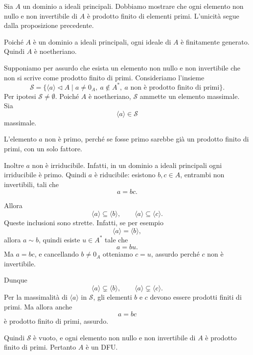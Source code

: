 \documentclass[a4paper]{article}
\begin{document}
\begin{radioactive}
\begin{snippetproof}{}
    Sia \(A\) un dominio a ideali principali.
    Dobbiamo mostrare che ogni elemento non nullo e non invertibile di \(A\) è prodotto finito di elementi primi.
    L'unicità segue dalla proposizione precedente.

    Poiché \(A\) è un dominio a ideali principali, ogni ideale di \(A\) è finitamente generato. Quindi \(A\) è noetheriano.

    Supponiamo per assurdo che esista un elemento non nullo e non invertibile che non si scrive come prodotto finito di primi.
    Consideriamo l'insieme
    \[
        \mathcal{S}
        =
        \{\langle a \rangle\triangleleft A
        \mid
        a\neq 0_A,\ a\notin A^\ast,\ a \text{ non è prodotto finito di primi}\}.
    \]
    Per ipotesi \(\mathcal{S}\neq\emptyset\).
    Poiché \(A\) è noetheriano, \(\mathcal{S}\) ammette un elemento massimale. Sia
    \[
        \langle a \rangle\in\mathcal{S}
    \]
    massimale.

    L'elemento \(a\) non è primo, perché se fosse primo sarebbe già un prodotto finito di primi, con un solo fattore.

    Inoltre \(a\) non è irriducibile. Infatti, in un dominio a ideali principali ogni irriducibile è primo. Quindi \(a\) è riducibile: esistono \(b,c\in A\), entrambi non invertibili, tali che
    \[
        a=bc.
    \]

    Allora
    \[
        \langle a \rangle\subseteq \langle b \rangle,
        \qquad
        \langle a \rangle\subseteq \langle c \rangle.
    \]
    Queste inclusioni sono strette. Infatti, se per esempio
    \[
        \langle a \rangle=\langle b \rangle,
    \]
    allora \(a\sim b\), quindi esiste \(u\in A^\ast\) tale che
    \[
        a=bu.
    \]
    Ma \(a=bc\), e cancellando \(b\neq 0_A\) otteniamo \(c=u\), assurdo perché \(c\) non è invertibile.

    Dunque
    \[
        \langle a \rangle\subsetneq \langle b \rangle,
        \qquad
        \langle a \rangle\subsetneq \langle c \rangle.
    \]
    Per la massimalità di \(\langle a \rangle\) in \(\mathcal{S}\), gli elementi \(b\) e \(c\) devono essere prodotti finiti di primi.
    Ma allora anche
    \[
        a=bc
    \]
    è prodotto finito di primi, assurdo.

    Quindi \(\mathcal{S}\) è vuoto, e ogni elemento non nullo e non invertibile di \(A\) è prodotto finito di primi.
    Pertanto \(A\) è un DFU.
\end{snippetproof}
\end{radioactive}
\end{document}
